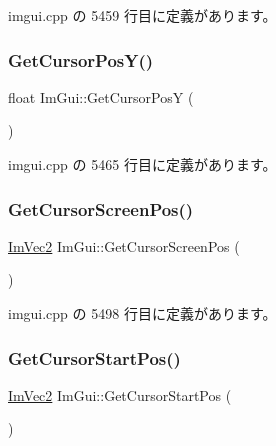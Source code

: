  imgui.\+cpp の 5459 行目に定義があります。

\mbox{\label{namespace_im_gui_a86e409551f256b542166989c558d41c1}} 
\subsubsection{\texorpdfstring{Get\+Cursor\+Pos\+Y()}{GetCursorPosY()}}
{\footnotesize\ttfamily float Im\+Gui\+::\+Get\+Cursor\+PosY (\begin{DoxyParamCaption}{ }\end{DoxyParamCaption})}



 imgui.\+cpp の 5465 行目に定義があります。

\mbox{\label{namespace_im_gui_adb0db3c1ee36f5085f35890a4229ae75}} 
\subsubsection{\texorpdfstring{Get\+Cursor\+Screen\+Pos()}{GetCursorScreenPos()}}
{\footnotesize\ttfamily \mbox{\hyperlink{struct_im_vec2}{Im\+Vec2}} Im\+Gui\+::\+Get\+Cursor\+Screen\+Pos (\begin{DoxyParamCaption}{ }\end{DoxyParamCaption})}



 imgui.\+cpp の 5498 行目に定義があります。

\mbox{\label{namespace_im_gui_a8ee9647de3b39fc7b77395082fc9e0cc}} 
\subsubsection{\texorpdfstring{Get\+Cursor\+Start\+Pos()}{GetCursorStartPos()}}
{\footnotesize\ttfamily \mbox{\hyperlink{struct_im_vec2}{Im\+Vec2}} Im\+Gui\+::\+Get\+Cursor\+Start\+Pos (\begin{DoxyParamCaption}{ }\end{DoxyParamCaption})}



